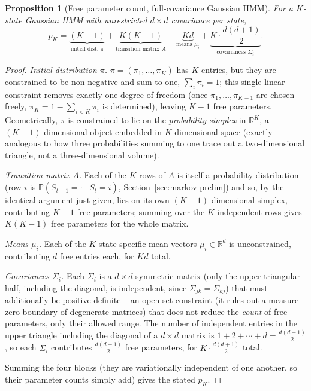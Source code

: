 \documentclass[11pt]{article}
\newtheorem{proposition}[theorem]{Proposition}
\theoremstyle{definition}
\theoremstyle{remark}
\begin{document}
\begin{proposition}[Free parameter count, full-covariance Gaussian HMM]
For a $K$-state Gaussian HMM with unrestricted $d\times d$ covariance per state,
\[
p_K = \underbrace{(K-1)}_{\text{initial dist.\ }\pi} + \underbrace{K(K-1)}_{\text{transition matrix }A} + \underbrace{Kd}_{\text{means }\mu_i} + \underbrace{K\cdot\frac{d(d+1)}{2}}_{\text{covariances }\Sigma_i}.
\]
\end{proposition}
\begin{proof}
\emph{Initial distribution $\pi$.} $\pi=(\pi_1,\dots,\pi_K)$ has $K$ entries, but they are constrained to be non-negative and sum to one, $\sum_i\pi_i=1$; this single linear constraint removes exactly one degree of freedom (once $\pi_1,\dots,\pi_{K-1}$ are chosen freely, $\pi_K=1-\sum_{i<K}\pi_i$ is determined), leaving $K-1$ free parameters. Geometrically, $\pi$ is constrained to lie on the \emph{probability simplex} in $\mathbb{R}^K$, a $(K-1)$-dimensional object embedded in $K$-dimensional space (exactly analogous to how three probabilities summing to one trace out a two-dimensional triangle, not a three-dimensional volume).

\emph{Transition matrix $A$.} Each of the $K$ rows of $A$ is itself a probability distribution (row $i$ is $\mathbb{P}(S_{t+1}=\cdot\mid S_t=i)$, Section~\ref{sec:markov-prelim}) and so, by the identical argument just given, lies on its own $(K-1)$-dimensional simplex, contributing $K-1$ free parameters; summing over the $K$ independent rows gives $K(K-1)$ free parameters for the whole matrix.

\emph{Means $\mu_i$.} Each of the $K$ state-specific mean vectors $\mu_i\in\mathbb{R}^d$ is unconstrained, contributing $d$ free entries each, for $Kd$ total.

\emph{Covariances $\Sigma_i$.} Each $\Sigma_i$ is a $d\times d$ symmetric matrix (only the upper-triangular half, including the diagonal, is independent, since $\Sigma_{jk}=\Sigma_{kj}$) that must additionally be positive-definite -- an open-set constraint (it rules out a measure-zero boundary of degenerate matrices) that does not reduce the \emph{count} of free parameters, only their allowed range. The number of independent entries in the upper triangle including the diagonal of a $d\times d$ matrix is $1+2+\cdots+d=\frac{d(d+1)}{2}$, so each $\Sigma_i$ contributes $\frac{d(d+1)}{2}$ free parameters, for $K\cdot\frac{d(d+1)}{2}$ total.

Summing the four blocks (they are variationally independent of one another, so their parameter counts simply add) gives the stated $p_K$.
\end{proof}
\end{document}

